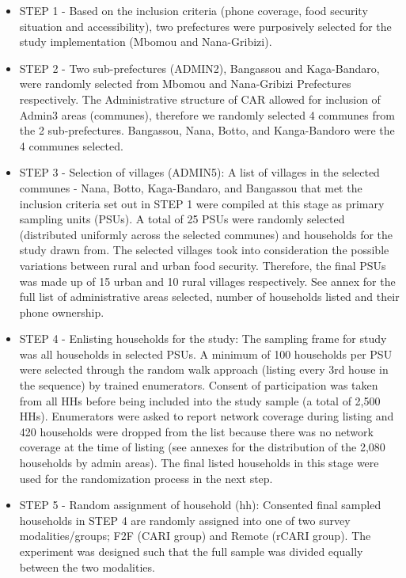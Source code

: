 \documentclass[11pt,harvard]{article}
\begin{document}
\begin{itemize}[label=--, left=1.5em]
	\item[1.] STEP 1 - Based on the inclusion criteria (phone coverage, food security situation and accessibility), two prefectures were purposively selected for the study implementation (Mbomou and Nana-Gribizi). 
	
	\item[2.] STEP 2 - Two sub-prefectures (ADMIN2), Bangassou and Kaga-Bandaro, were randomly selected from Mbomou and Nana-Gribizi Prefectures respectively. The Administrative structure of CAR allowed for inclusion of Admin3 areas (communes), therefore we randomly selected 4 communes from the 2 sub-prefectures. Bangassou, Nana, Botto, and Kanga-Bandoro were the 4 communes selected. 
	
	\item[3.] STEP 3 - Selection of villages (ADMIN5): A list of villages in the selected communes - Nana, Botto, Kaga-Bandaro, and Bangassou that met the inclusion criteria set out in STEP 1 were compiled at this stage as primary sampling units (PSUs). A total of 25 PSUs were randomly selected (distributed uniformly across the selected communes) and households for the study drawn from. The selected villages took into consideration the possible variations between rural and urban food security. Therefore, the final PSUs was made up of 15 urban and 10 rural villages respectively. See annex for the full list of administrative areas selected, number of households listed and their phone ownership.
	
	\item[4.] STEP 4 - Enlisting households for the study: The sampling frame for study was all households in selected PSUs. A minimum of 100 households per PSU were selected through the random walk approach (listing every 3rd house in the sequence) by trained enumerators. Consent of participation was taken from all HHs before being included into the study sample (a total of 2,500 HHs). Enumerators were asked to report network coverage during listing and 420 households were dropped from the list because there was no network coverage at the time of listing (see annexes for the distribution of the 2,080 households by admin areas). The final listed households in this stage were used for the randomization process in the next step.
	
	\item[5.] STEP 5 - Random assignment of household (hh): Consented final sampled households in STEP 4 are randomly assigned into one of two survey modalities/groups; F2F (CARI group) and Remote (rCARI group). The experiment was designed such that the full sample was divided equally between the two modalities.
	

\end{itemize}
\end{document}
